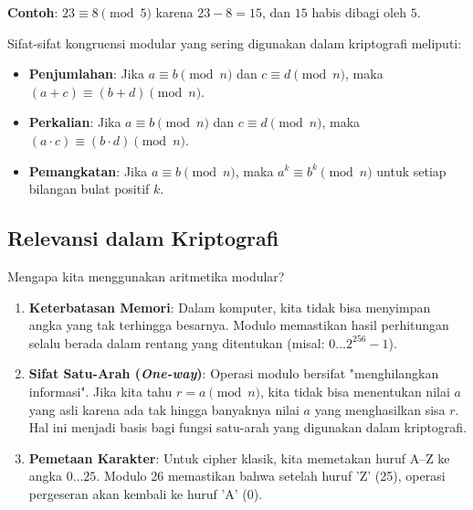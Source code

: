 \textbf{Contoh}:
$23 \equiv 8 \pmod{5}$ karena $23 - 8 = 15$, dan $15$ habis dibagi oleh $5$.

Sifat-sifat kongruensi modular yang sering digunakan dalam kriptografi meliputi:
\begin{itemize}
    \item \textbf{Penjumlahan}: Jika $a \equiv b \pmod{n}$ dan $c \equiv d \pmod{n}$, maka $(a + c) \equiv (b + d) \pmod{n}$.
    \item \textbf{Perkalian}: Jika $a \equiv b \pmod{n}$ dan $c \equiv d \pmod{n}$, maka $(a \cdot c) \equiv (b \cdot d) \pmod{n}$.
    \item \textbf{Pemangkatan}: Jika $a \equiv b \pmod{n}$, maka $a^k \equiv b^k \pmod{n}$ untuk setiap bilangan bulat positif $k$.
\end{itemize}

\subsection{Relevansi dalam Kriptografi}

Mengapa kita menggunakan aritmetika modular?
\begin{enumerate}
    \item \textbf{Keterbatasan Memori}: Dalam komputer, kita tidak bisa menyimpan angka yang tak terhingga besarnya. Modulo memastikan hasil perhitungan selalu berada dalam rentang yang ditentukan (misal: $0 \dots 2^{256}-1$).
    \item \textbf{Sifat Satu-Arah (\textit{One-way})}: Operasi modulo bersifat "menghilangkan informasi". Jika kita tahu $r = a \pmod{n}$, kita tidak bisa menentukan nilai $a$ yang asli karena ada tak hingga banyaknya nilai $a$ yang menghasilkan sisa $r$. Hal ini menjadi basis bagi fungsi satu-arah yang digunakan dalam kriptografi.
    \item \textbf{Pemetaan Karakter}: Untuk cipher klasik, kita memetakan huruf A--Z ke angka $0 \dots 25$. Modulo 26 memastikan bahwa setelah huruf 'Z' (25), operasi pergeseran akan kembali ke huruf 'A' (0).
\end{enumerate}
